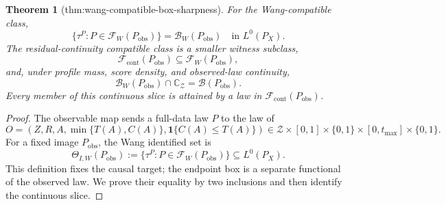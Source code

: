 \documentclass{article}
\newtheorem{theorem}{Theorem}
\begin{document}
\begin{theorem}[thm:wang-compatible-box-sharpness]\label{thm:wang-compatible-box-sharpness}
For the Wang-compatible class,
\[
\{\tau^P:P\in\mathcal F_W(P_{\mathrm{obs}})\}
=\mathcal B_W(P_{\mathrm{obs}})
\quad\text{in }L^0(P_X).
\]
The residual-continuity compatible class is a smaller witness subclass,
\[
\mathcal F_{\mathrm{cont}}(P_{\mathrm{obs}})
\subseteq\mathcal F_W(P_{\mathrm{obs}}),
\]
and, under profile mass, score density, and observed-law continuity,
\[
\mathcal B_W(P_{\mathrm{obs}})\cap\mathbb C_{\mathcal Z}
=\mathcal B(P_{\mathrm{obs}}).
\]
Every member of this continuous slice is attained by a law in \(\mathcal F_{\mathrm{cont}}(P_{\mathrm{obs}})\).
\end{theorem}
\begin{proof}
The observable map sends a full-data law \(P\) to the law of
\[
O=(Z,R,A,\min\{T(A),C(A)\},\mathbf 1\{C(A)\le T(A)\})
\in\mathcal Z\times[0,1]\times\{0,1\}\times[0,t_{\max}]\times\{0,1\}.
\]
For a fixed image \(P_{\mathrm{obs}}\), the Wang identified set is
\[
\Theta_{I,W}(P_{\mathrm{obs}})
:=\{\tau^P:P\in\mathcal F_W(P_{\mathrm{obs}})\}
\subseteq L^0(P_X).
\]
This definition fixes the causal target; the endpoint box is a separate functional of the observed law.  We prove their equality by two inclusions and then identify the continuous slice.


\end{proof}
\end{document}
